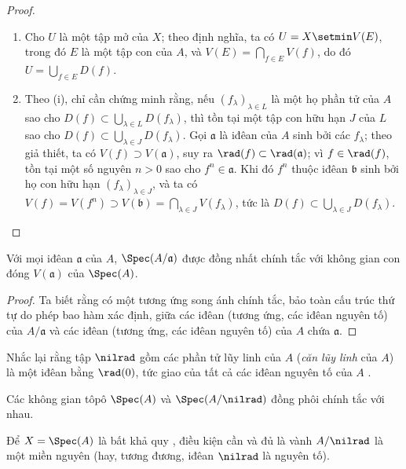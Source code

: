 \documentclass[oneside]{amsart}
\let\EGAOriginalLabel\label
\renewcommand{\label}[1]{\phantomsection\EGAOriginalLabel{#1}}
\begin{document}
\begin{proof}
\medskip\noindent
\begin{enumerate}
  \item[(i)] Cho $U$ là một tập mở của $X$;
    theo định nghĩa, ta có $U=X\setmin V(E)$, trong đó $E$ là một tập con của $A$, và $V(E)=\bigcap_{f\in E}V(f)$, do đó $U=\bigcup_{f\in E}D(f)$.
  \item[(ii)] Theo (i), chỉ cần chứng minh rằng, nếu $(f_\lambda)_{\lambda\in L}$ là một họ phần tử của $A$ sao cho $D(f)\subset\bigcup_{\lambda\in L}D(f_\lambda)$, thì tồn tại một tập con hữu hạn $J$ của $L$ sao cho $D(f)\subset\bigcup_{\lambda\in J}D(f_\lambda)$.
    Gọi $\mathfrak{a}$ là iđêan của $A$ sinh bởi các $f_\lambda$;
    theo giả thiết, ta có $V(f)\supset V(\mathfrak{a})$, suy ra $\rad(f)\subset\rad(\mathfrak{a})$;
    vì $f\in\rad(f)$, tồn tại một số nguyên $n>0$ sao cho $f^n\in\mathfrak{a}$.
    Khi đó $f^n$ thuộc iđêan $\mathfrak{b}$ sinh bởi họ con hữu hạn $(f_\lambda)_{\lambda\in J}$, và ta có $V(f)=V(f^n)\supset V(\mathfrak{b})=\bigcap_{\lambda\in J}V(f_\lambda)$, tức là $D(f)\subset\bigcup_{\lambda\in J}D(f_\lambda)$.
\end{enumerate}
\end{proof}

\begin{proposition}[1.1.11]
\label{I.1.1.11}
Với mọi iđêan $\mathfrak{a}$ của $A$, $\Spec(A/\mathfrak{a})$ được đồng nhất chính tắc với không gian con đóng $V(\mathfrak{a})$ của $\Spec(A)$.
\end{proposition}

\begin{proof}
Ta biết rằng có một tương ứng song ánh chính tắc, bảo toàn cấu trúc thứ tự do phép bao hàm xác định, giữa các iđêan (tương ứng, các iđêan nguyên tố) của $A/\mathfrak{a}$ và các iđêan (tương ứng, các iđêan nguyên tố) của $A$ chứa $\mathfrak{a}$.
\end{proof}

Nhắc lại rằng tập $\nilrad$ gồm các phần tử lũy linh của $A$ (\emph{căn lũy linh} của $A$) là một iđêan bằng $\rad(0)$, tức giao của tất cả các iđêan nguyên tố của $A$ .

\begin{corollary}[1.1.12]
\label{I.1.1.12}
Các không gian tôpô $\Spec(A)$ và $\Spec(A/\nilrad)$ đồng phôi chính tắc với nhau.
\end{corollary}

\begin{proposition}[1.1.13]
\label{I.1.1.13}
Để $X=\Spec(A)$ là bất khả quy , điều kiện cần và đủ là vành $A/\nilrad$ là một miền nguyên (hay, tương đương, iđêan $\nilrad$ là nguyên tố).
\end{proposition}
\end{document}
